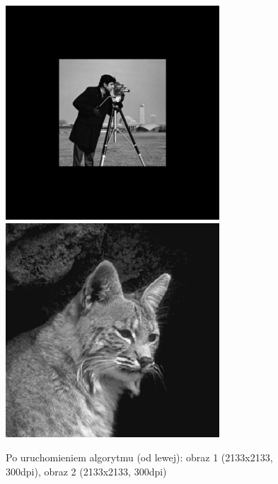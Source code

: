 \documentclass[a4paper,12pt]{book}
\begin{document}
\begin{figure}
	\caption{Po uruchomieniem algorytmu (od lewej): obraz 1 (2133x2133, 300dpi), obraz 2 (2133x2133, 300dpi)}
	\includegraphics[width=8cm, height=8cm]{man-modified.png}
	\includegraphics[width=8cm, height=8cm]{cat-unmodified.jpg}
\end{figure}
\end{document}
